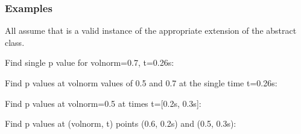 \documentclass[letterpaper,10pt,english]{sphinxmanual}
\begin{document}
\begin{fulllineitems}
\begin{fulllineitems}
\begin{quote}
\begin{description}
\begin{itemize}
\end{itemize}


\end{description}\end{quote}
\subsubsection*{Examples}

All assume that  is a valid instance of the appropriate
extension of the {\hyperref[\detokenize{eqtools:eqtools.core.Equilibrium}]{}} abstract class.

Find single p value for volnorm=0.7, t=0.26s:

\begin{sphinxVerbatim}[commandchars=\\\{\}]
   
\end{sphinxVerbatim}

Find p values at volnorm values of 0.5 and 0.7 at the single time
t=0.26s:

\begin{sphinxVerbatim}[commandchars=\\\{\}]
  \PYG{p}{[} \PYG{p}{]} 
\end{sphinxVerbatim}

Find p values at volnorm=0.5 at times t={[}0.2s, 0.3s{]}:

\begin{sphinxVerbatim}[commandchars=\\\{\}]
   \PYG{p}{[} \PYG{p}{]}
\end{sphinxVerbatim}

Find p values at (volnorm, t) points (0.6, 0.2s) and (0.5, 0.3s):

\begin{sphinxVerbatim}[commandchars=\\\{\}]
  \PYG{p}{[} \PYG{p}{]} \PYG{p}{[} \PYG{p}{]} 
\end{sphinxVerbatim}


\end{fulllineitems}
\end{fulllineitems}
\end{document}
